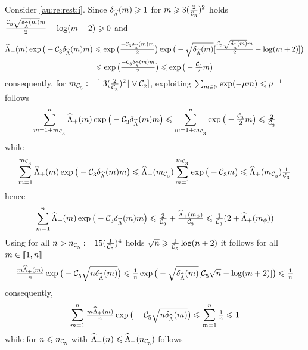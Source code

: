  \begin{pro}
 Consider \ref{au:re:rest:i}.
   Since $\cmeiSv\geq1$ for
   $\Di\geq3(\tfrac{2}{\cst{3}})^2$ holds
   $\tfrac{\cst{3}\sqrt{\cmeiSv}\Di}{2}-\log(\Di+2)\geq0$
   and%
   \begin{multline*}
     \meiSv\exp\big(-\cst{3}\cmeiSv\Di\big)\leq
     \exp\big(\tfrac{-\cst{3}\cmeiSv\Di}{2}\big)
     \exp\big(-\sqrt{\cmeiSv}[\tfrac{\cst{3}\sqrt{\cmeiSv}\Di}{2}-\log(\Di+2)]\big)\\
     \leq\exp\big(\tfrac{-\cst{3}\cmeiSv\Di}{2}\big)
     \leq\exp\big(-\tfrac{\cst{3}}{2}\Di\big)
   \end{multline*}
   consequently, for
   $\Di_{\cst{3}}:=[\floor{3(\tfrac{2}{\cst{3}})^2}\vee \cst{2}]$, exploiting
   $\sum_{\Di\in\Nz}\exp(-\mu\Di)\leq \mu^{-1}$ follows
   \begin{displaymath}
     \sum_{\Di=1+\Di_{\cst{3}}}^{\ssY}\meiSv\exp\big(-\cst{3}\cmeiSv\Di\big)\leq
     \sum_{\Di=1+\Di_{\cst{3}}}^{\ssY}\exp\big(-\tfrac{\cst{3}}{2}\Di\big)
     \leq {\tfrac{2}{\cst{3}}}
   \end{displaymath}
   while
   \begin{displaymath}
    \sum_{\Di=1}^{\Di_{\cst{3}}}\meiSv\exp\big(-\cst{3}\cmeiSv\Di\big)\leq
    \meiSv[\Di_{\cst{3}}]\sum_{\Di=1}^{\Di_{\cst{3}}}\exp\big(-\cst{3}\Di\big)
    \leq \meiSv[\Di_{\cst{3}}]\tfrac{1}{\cst{3}}
  \end{displaymath}
  hence
  \begin{displaymath}
    \sum_{\Di=1}^{\ssY}\meiSv\exp\big(-\cst{3}\cmeiSv\Di\big)\leq
    \tfrac{2}{\cst{3}}+\tfrac{\meiSv[\Di_{\ydf}]}{\cst{3}}\leq \tfrac{1}{\cst{3}}(2+\meiSv[\Di_{\ydf}])
  \end{displaymath}
  Using for all $ \ssY>\ssY_{\cst{5}}:=15(\tfrac{1}{\cst{5}})^4$ holds 
  $\sqrt{n}\geq\tfrac{1}{\cst{5}}\log(n+2)$ it follows for all $\Di\in\nset{1,n}$
  \begin{displaymath}
    \tfrac{\Di\meiSv}{\ssY}\exp\big(-\cst{5}\sqrt{n\cmeiSv}\big)
    \leq
    \tfrac{1}{\ssY}\exp\big(-\sqrt{\cmeiSv}[\cst{5}\sqrt{\ssY}-\log(\Di+2)]\big)\leq \tfrac{1}{\ssY}
  \end{displaymath}
  consequently, 
  \begin{equation*}
    \sum_{\Di=1}^{\ssY}\tfrac{\Di\meiSv}{\ssY}\exp\big(-\cst{5}\sqrt{n\cmeiSv}\big)
    \leq\sum_{\Di=1}^{\ssY}\tfrac{1}{\ssY}\leq1
  \end{equation*}
  while for $\ssY\leq \ssY_{\cst{5}}$ with
  $\meiSv[\ssY]\leq\meiSv[\ssY_{\cst{5}}]$ follows

\end{pro}
